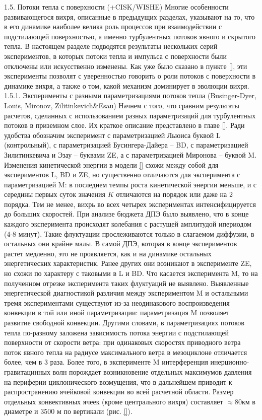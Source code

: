 1.5.	Потоки тепла с поверхности (+CISK/WISHE)
Многие особенности развивающегося вихря, описанные в предыдущих разделах, указывают на то, что в его динамике наиболее велика роль процессов при взаимодействии с подстилающей поверхностью, а именно турбулентных потоков явного и скрытого тепла. 
В настоящем разделе подводятся результаты нескольких серий экспериментов, в которых потоки тепла и импульса с поверхности были отключены или искусственно изменены. Как уже было сказано в пункте \ref{}, эти эксперименты позволят с уверенностью говорить о роли потоков с поверхности в динамике вихря, а также о том, какой механизм доминирует в эволюции вихря.
1.5.1.	Эксперименты с разными параметризациями потоков тепла (Businger-Dyer, Louis, Mironov, Zilitinkevich&Esau)
Начнем с того, что сравним результаты расчетов, сделанных с использованием разных параметризаций для турбулентных потоков в приземном слое. Их краткое описание представлено в главе \ref{}. Ради удобства обозначим эксперимент с параметризацией Льюиса буквой L (контрольный), с параметризацией Бусингера-Дайера – BD, с параметризацией Зилитинкевича и Эзау – буквами ZE, а с параметризацией Миронова – буквой M.
Изменения кинетической энергии в модели \ref{} схожи между собой для экспериментов L, BD и ZE, но существенно отличаются для эксперимента с параметризацией M: в последнем темпы роста кинетической энергии меньше, и с середины первых суток значения $K$ отличаются на порядок или даже на 2 порядка. Тем не менее, вихрь во всех четырех экспериментах интенсифицируется до больших скоростей.
При анализе бюджета ДПЭ было выявлено, что в конце каждого эксперимента происходят колебания с растущей амплитудой ипериодом (4-8 минут). Такие флуктуации прослеживаются только в слагаемом диффузии, в остальных они крайне малы. В самой ДПЭ, которая в конце экспериментов растет медленно, это не проявляется, как и на динамике остальных энергетических характеристик. Ранее других они возникают в эксперименте ZE, но схожи по характеру с таковыми в L и BD. Что касается эксперимента M, то на полученном отрезке эксперимента таких флуктуаций не выявлено.
Выявленные энергетической диагностикой различия между экспериментом M и остальными тремя экспериментами существуют из-за неодинакового воспроизведения конвекции в той или иной параметризации: параметризация M позволяет развитие свободной конвекции. Другими словами, в параметризациях потоков тепла по-разному заложена зависимость потока энергии с подстилающей поверхности от скорости ветра: при одинаковых скоростях приводного ветра поток явного тепла на радиусе максимального ветра в мезоциклоне отличается более, чем в 3 раза. Более того, в эксперименте M интерференция инерционно-гравитацинных волн порождает возникновение отдельных максимумов давления на периферии циклонического возмущения, что в дальнейшем приводит к распространению ячейковой конвекции во всей расчетной области. Размер отдельных конвективных ячеек (кроме центрального вихря) составляет $\approx 80 км$ в диаметре и 3500 м по вертикали (рис. \ref{}).
